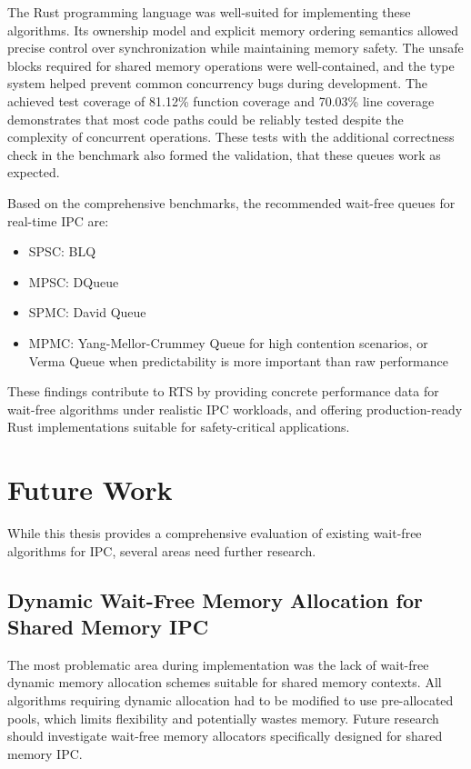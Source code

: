The Rust programming language was well-suited for implementing these algorithms. Its ownership model and explicit memory ordering semantics allowed precise control over synchronization while maintaining memory safety. The unsafe blocks required for shared memory operations were well-contained, and the type system helped prevent common concurrency bugs during development. The achieved test coverage of 81.12\% function coverage and 70.03\% line coverage demonstrates that most code paths could be reliably tested despite the complexity of concurrent operations. These tests with the additional correctness check in the benchmark also formed the validation, that these queues work as expected.

Based on the comprehensive benchmarks, the recommended wait-free queues for real-time IPC are:
\begin{itemize}
\item \ac{SPSC}: \acf{BLQ}
\item \ac{MPSC}: DQueue
\item \ac{SPMC}: David Queue
\item \ac{MPMC}: Yang-Mellor-Crummey Queue for high contention scenarios, or Verma Queue when predictability is more important than raw performance
\end{itemize}

These findings contribute to \ac{RTS} by providing concrete performance data for wait-free algorithms under realistic \ac{IPC} workloads, and offering production-ready Rust implementations suitable for safety-critical applications.

\section{Future Work}
While this thesis provides a comprehensive evaluation of existing wait-free algorithms for \ac{IPC}, several areas need further research.

\subsection{Dynamic Wait-Free Memory Allocation for Shared Memory \acf{IPC}}
The most problematic area during implementation was the lack of wait-free dynamic memory allocation schemes suitable for shared memory contexts. All algorithms requiring dynamic allocation had to be modified to use pre-allocated pools, which limits flexibility and potentially wastes memory. Future research should investigate wait-free memory allocators specifically designed for shared memory \ac{IPC}.

